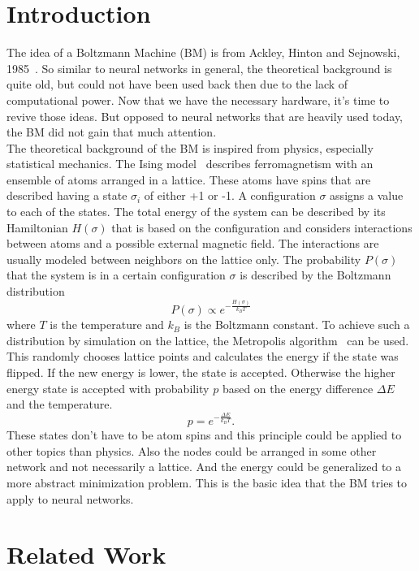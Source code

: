 \documentclass[12pt,twoside]{article}
\theoremstyle{plain}
\theoremstyle{definition}
\theoremstyle{remark}
\begin{document}
\section{Introduction}
\label{sec:intro}

The idea of a Boltzmann Machine (BM) is from Ackley, Hinton and Sejnowski, 1985~\cite{Ackley}. So similar to neural networks in general, the theoretical background is quite old, but could not have been used back then due to the lack of computational power. Now that we have the necessary hardware, it's time to revive those ideas. But opposed to neural networks that are heavily used today, the BM did not gain that much attention.\\

The theoretical background of the BM is inspired from physics, especially statistical mechanics. The Ising model~\cite{Ising} describes ferromagnetism with an ensemble of atoms arranged in a lattice. These atoms have spins that are described having a state $\sigma_i$ of either +1 or -1. A configuration $\sigma$ assigns a value to each of the states. The total energy of the system can be described by its Hamiltonian $H(\sigma)$ that is based on the configuration and considers interactions between atoms and a possible external magnetic field. The interactions are usually modeled between neighbors on the lattice only. The probability $P(\sigma)$ that the system is in a certain configuration $\sigma$ is described by the Boltzmann distribution
$$P(\sigma) \propto e^{-\frac{H(\sigma)}{k_BT}}$$
where $T$ is the temperature and $k_B$ is the Boltzmann constant. To achieve such a distribution by simulation on the lattice, the Metropolis algorithm~\cite{Metropolis} can be used. This randomly chooses lattice points and calculates the energy if the state was flipped. If the new energy is lower, the state is accepted. Otherwise the higher energy state is accepted with probability $p$ based on the energy difference $\Delta E$ and the temperature.
$$p = e^{-\frac{\Delta E}{k_BT}}.$$
These states don't have to be atom spins and this principle could be applied to other topics than physics. Also the nodes could be arranged in some other network and not necessarily a lattice. And the energy could be generalized to a more abstract minimization problem. This is the basic idea that the BM tries to apply to neural networks.


\section{Related Work}
\label{sec:related}
\end{document}
